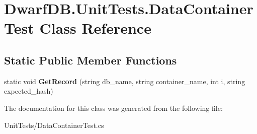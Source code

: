 \hypertarget{class_dwarf_d_b_1_1_unit_tests_1_1_data_container_test}{
\section{DwarfDB.UnitTests.DataContainerTest Class Reference}
\label{class_dwarf_d_b_1_1_unit_tests_1_1_data_container_test}
}
\subsection*{Static Public Member Functions}
\begin{DoxyCompactItemize}
\item 
\hypertarget{class_dwarf_d_b_1_1_unit_tests_1_1_data_container_test_a38c0916d03b70f9037e112f6bb43fce7}{
static void {\bfseries GetRecord} (string db\_\-name, string container\_\-name, int i, string expected\_\-hash)}
\label{class_dwarf_d_b_1_1_unit_tests_1_1_data_container_test_a38c0916d03b70f9037e112f6bb43fce7}

\end{DoxyCompactItemize}


The documentation for this class was generated from the following file:\begin{DoxyCompactItemize}
\item 
UnitTests/DataContainerTest.cs\end{DoxyCompactItemize}

